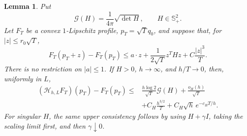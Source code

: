 \documentclass{smfart}
\newtheorem{lemma}[theorem]{Lemma}
\theoremstyle{definition}
\newcommand{\1}{\mathbf 1}
\begin{document}
\begin{lemma}\label{lem:localized-upper-consistency}
Put
\begin{equation}
\mathcal G(H)=\frac1{4\pi}\sqrt{\det H},\qquad H\in\mathbb S_ +^2.
\tag{33}
\end{equation}
Let $F_ T$ be a convex $1$-Lipschitz profile, $p_ T=\sqrt Tq_ 0$,
and suppose that, for $|z|\leq r_ 0\sqrt T$,
\begin{equation}
F_ T(p_ T+z)-F_ T(p_ T)
\leq a\cdot z+\frac1{2\sqrt T}z^THz+C\frac{|z|^3}{T}.
\tag{33a}
\end{equation}
There is no restriction on $|a|\leq1$.  If $H>0$, $h\to\infty$,
and $h/T\to0$, then, uniformly in $L$,
\begin{equation}
\begin{split}
(\mathcal H_ {h,L}F_ T)(p_ T)-F_ T(p_ T)
\leq{}&\frac{h\log2}{\sqrt T}\mathcal G(H)+\frac{o_ H(h)}{\sqrt T}\\
&+C_ H\frac{h^{3/2}}T+C_ H\sqrt h\,e^{-c_ HT/h}.                  
\end{split}
\tag{33b}
\end{equation}
For singular $H$, the same upper consistency follows by using
$H+\gamma I$, taking the scaling limit first, and then
$\gamma\downarrow0$.

\end{lemma}
\end{document}
